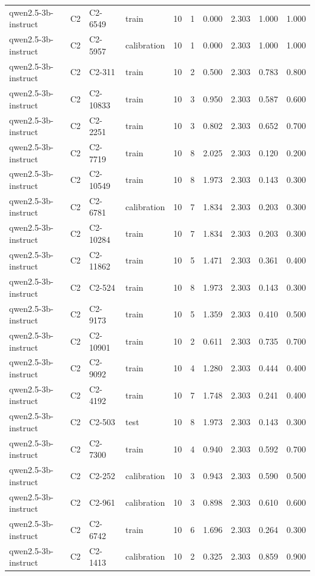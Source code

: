 \begin{table}
\begin{tabular}{llllrrrrrr}
qwen2.5-3b-instruct & C2 & C2-6549 & train & 10 & 1 & 0.000 & 2.303 & 1.000 & 1.000 \\
qwen2.5-3b-instruct & C2 & C2-5957 & calibration & 10 & 1 & 0.000 & 2.303 & 1.000 & 1.000 \\
qwen2.5-3b-instruct & C2 & C2-311 & train & 10 & 2 & 0.500 & 2.303 & 0.783 & 0.800 \\
qwen2.5-3b-instruct & C2 & C2-10833 & train & 10 & 3 & 0.950 & 2.303 & 0.587 & 0.600 \\
qwen2.5-3b-instruct & C2 & C2-2251 & train & 10 & 3 & 0.802 & 2.303 & 0.652 & 0.700 \\
qwen2.5-3b-instruct & C2 & C2-7719 & train & 10 & 8 & 2.025 & 2.303 & 0.120 & 0.200 \\
qwen2.5-3b-instruct & C2 & C2-10549 & train & 10 & 8 & 1.973 & 2.303 & 0.143 & 0.300 \\
qwen2.5-3b-instruct & C2 & C2-6781 & calibration & 10 & 7 & 1.834 & 2.303 & 0.203 & 0.300 \\
qwen2.5-3b-instruct & C2 & C2-10284 & train & 10 & 7 & 1.834 & 2.303 & 0.203 & 0.300 \\
qwen2.5-3b-instruct & C2 & C2-11862 & train & 10 & 5 & 1.471 & 2.303 & 0.361 & 0.400 \\
qwen2.5-3b-instruct & C2 & C2-524 & train & 10 & 8 & 1.973 & 2.303 & 0.143 & 0.300 \\
qwen2.5-3b-instruct & C2 & C2-9173 & train & 10 & 5 & 1.359 & 2.303 & 0.410 & 0.500 \\
qwen2.5-3b-instruct & C2 & C2-10901 & train & 10 & 2 & 0.611 & 2.303 & 0.735 & 0.700 \\
qwen2.5-3b-instruct & C2 & C2-9092 & train & 10 & 4 & 1.280 & 2.303 & 0.444 & 0.400 \\
qwen2.5-3b-instruct & C2 & C2-4192 & train & 10 & 7 & 1.748 & 2.303 & 0.241 & 0.400 \\
qwen2.5-3b-instruct & C2 & C2-503 & test & 10 & 8 & 1.973 & 2.303 & 0.143 & 0.300 \\
qwen2.5-3b-instruct & C2 & C2-7300 & train & 10 & 4 & 0.940 & 2.303 & 0.592 & 0.700 \\
qwen2.5-3b-instruct & C2 & C2-252 & calibration & 10 & 3 & 0.943 & 2.303 & 0.590 & 0.500 \\
qwen2.5-3b-instruct & C2 & C2-961 & calibration & 10 & 3 & 0.898 & 2.303 & 0.610 & 0.600 \\
qwen2.5-3b-instruct & C2 & C2-6742 & train & 10 & 6 & 1.696 & 2.303 & 0.264 & 0.300 \\
qwen2.5-3b-instruct & C2 & C2-1413 & calibration & 10 & 2 & 0.325 & 2.303 & 0.859 & 0.900 \\

\end{tabular}
\end{table}
